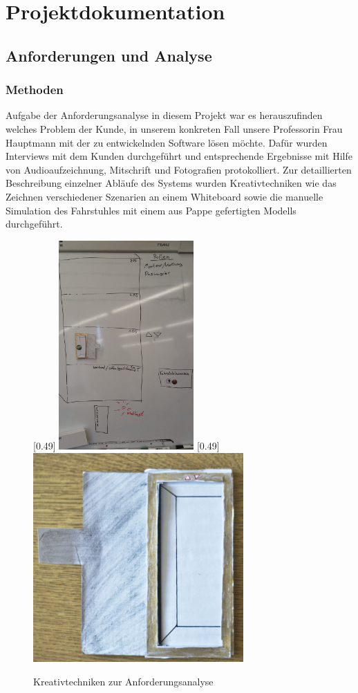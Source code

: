 \part{Projektdokumentation}
\chapter{Anforderungen und Analyse}
\section{Methoden}
Aufgabe der Anforderungsanalyse in diesem Projekt war es herauszufinden
welches Problem der Kunde, in unserem konkreten Fall unsere Professorin Frau 
Hauptmann mit der zu entwickelnden Software lösen möchte. Dafür wurden 
Interviews mit dem Kunden durchgeführt und entsprechende Ergebnisse mit Hilfe 
von Audioaufzeichnung, Mitschrift und Fotografien protokolliert. Zur 
detaillierten Beschreibung einzelner Abläufe des Systems wurden 
Kreativtechniken wie das Zeichnen verschiedener Szenarien an einem Whiteboard 
sowie die manuelle Simulation des Fahrstuhles mit einem aus Pappe gefertigten Modells durchgeführt.
\begin{figure}[hbt]
\centering
{}[0.49\linewidth]
{\includegraphics[height=8cm]{images/kundengespraech1.jpg}}
[0.49\linewidth]
{\includegraphics[height=8cm]{images/pappfahrstuhl.jpg}}
\caption{Kreativtechniken zur Anforderungsanalyse}
\end{figure}
